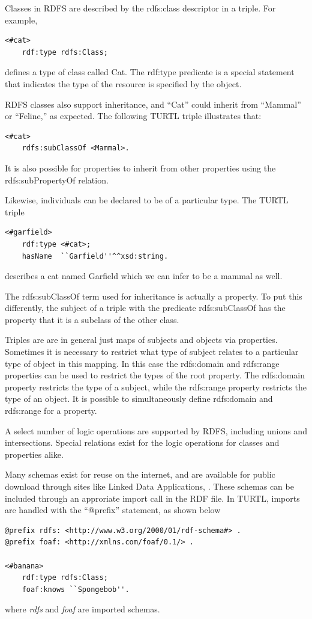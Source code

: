 Classes in RDFS are described by the rdfs:class descriptor in a triple. For
example,
\begin{lstlisting}
<#cat>
    rdf:type rdfs:Class;
\end{lstlisting}
defines a type of class called Cat. The rdf:type predicate is a special
statement that indicates the type of the resource is specified by the
object. 

RDFS classes also support inheritance, and ``Cat'' could inherit from
``Mammal'' or ``Feline,'' as expected. The following TURTL triple illustrates
that:
\begin{lstlisting}
<#cat>
    rdfs:subClassOf <Mammal>.
\end{lstlisting}
It is also possible for properties to inherit from other properties using the
rdfs:subPropertyOf relation.

Likewise, individuals can be declared to be of a particular type. The TURTL
triple
\begin{lstlisting}
<#garfield>
    rdf:type <#cat>;
    hasName  ``Garfield''^^xsd:string.
\end{lstlisting}
describes a cat named Garfield which we can infer to be a mammal as well.

The rdfs:subClassOf term used for inheritance is actually a property. To put
this differently, the subject of a triple with the predicate rdfs:subClassOf
has the property that it is a subclass of the other class. 

Triples are are in general just maps of subjects and objects via properties.
Sometimes it is necessary to restrict what type of subject relates to a
particular type of object in this mapping. In this case the rdfs:domain and
rdfs:range properties can be used to restrict the types of the root property.
The rdfs:domain property restricts the type of a subject, while the rdfs:range
property restricts the type of an object. It is possible to simultaneously
define rdfs:domain and rdfs:range for a property.

A select number of logic operations are supported by RDFS, including unions and
intersections. Special relations exist for the logic operations for classes and
properties alike.

Many schemas exist for reuse on the internet, and are available for
public download through sites like Linked Data Applications,
\cite{lov}. These schemas can be included through an approriate import
call in the RDF file. In TURTL, imports are handled with the ``@prefix''
statement, as shown below
\begin{lstlisting}
@prefix rdfs: <http://www.w3.org/2000/01/rdf-schema#> .
@prefix foaf: <http://xmlns.com/foaf/0.1/> .

<#banana>
    rdf:type rdfs:Class;
    foaf:knows ``Spongebob''.
\end{lstlisting}
where \textit{rdfs} and \textit{foaf} are imported schemas.

